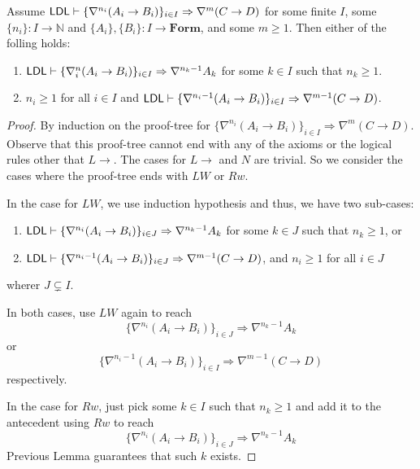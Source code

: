 \documentclass[a4paper, 12pt]{paper}
\begin{document}
\begin{thm}
  Assume $\mathsf{LDL} \vdash \{ \nabla^{n_i} (A_i \to B_i) \}_{i \in I} \Rightarrow \nabla^m (C \to D)$ for some finite $I$, some $\{ n_i \} : I \to \mathbb{N}$ and $\{ A_i \}, \{ B_i \} : I \to \textbf{Form}$, and some $m \ge 1$. Then either of the folling holds:
  \begin{enumerate}
    \item $\mathsf{LDL} \vdash \{ \nabla^n_i (A_i \to B_i) \}_{i \in I} \Rightarrow \nabla^{n_k - 1} A_k$ for some $k \in I$ such that $n_k \ge 1$.
    \item $n_i \ge 1$ for all $i \in I$ and $\mathsf{LDL} \vdash \{ \nabla^{n_i - 1} (A_i \to B_i) \}_{i \in I} \Rightarrow \nabla^{m - 1} (C \to D)$.
  \end{enumerate}
\end{thm}
\begin{proof}


  By induction on the proof-tree for $\{ \nabla^{n_i} (A_i \to B_i) \}_{i \in I} \Rightarrow \nabla^m (C \to D)$. Observe that this proof-tree cannot end with any of the axioms or the logical rules other that $L \to$. The cases for $L \to$ and $N$ are trivial. So we consider the cases where the proof-tree ends with $LW$ or $Rw$. 

  In the case for $LW$, we use induction hypothesis and thus, we have two sub-cases:
  \begin{enumerate}
    \item $\mathsf{LDL} \vdash \{ \nabla^{n_i} (A_i \to B_i) \}_{i \in J} \Rightarrow \nabla^{n_k - 1} A_k$ for some $k \in J$ such that $n_k \ge 1$, or
    \item $\mathsf{LDL} \vdash \{ \nabla^{n_i - 1} (A_i \to B_i) \}_{i \in J} \Rightarrow \nabla^{m - 1} (C \to D)$, and $n_i \ge 1$ for all $i \in J$
  \end{enumerate}
  wherer $J \subsetneq I$.
  
  In both cases, use $LW$ again to reach $$\{ \nabla^{n_i} (A_i \to B_i) \}_{i \in J} \Rightarrow \nabla^{n_k - 1} A_k$$ or $$\{ \nabla^{n_i - 1} (A_i \to B_i) \}_{i \in I} \Rightarrow \nabla^{m - 1} (C \to D)$$ respectively.

  In the case for $Rw$, just pick some $k \in I$ such that $n_{k} \ge 1$ and add it to the antecedent using $Rw$ to reach $$ \{ \nabla^{n_i} (A_i \to B_i) \}_{i \in J} \Rightarrow \nabla^{n_k - 1} A_k $$
  Previous Lemma guarantees that such $k$ exists.
\end{proof}
\end{document}
